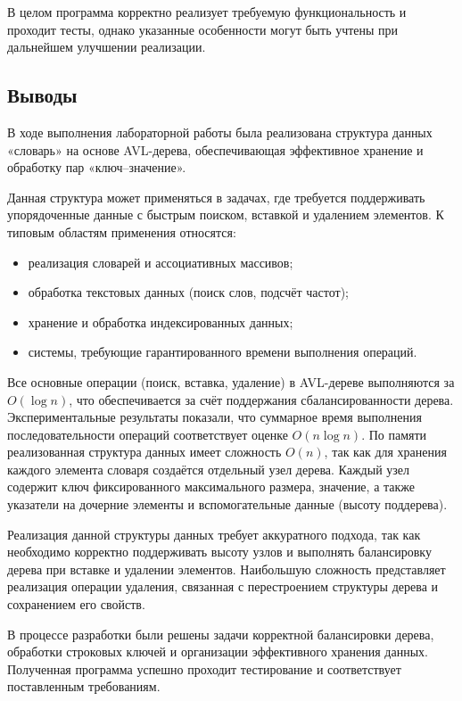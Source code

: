 \documentclass[12pt]{article}
\begin{document}
В целом программа корректно реализует требуемую функциональность и проходит тесты, однако указанные особенности могут быть учтены при дальнейшем улучшении реализации.

\subsection*{Выводы}

В ходе выполнения лабораторной работы была реализована структура данных «словарь» на основе AVL-дерева, обеспечивающая эффективное хранение и обработку пар «ключ–значение».

Данная структура может применяться в задачах, где требуется поддерживать упорядоченные данные с быстрым поиском, вставкой и удалением элементов. К типовым областям применения относятся:
\begin{itemize}
	\item реализация словарей и ассоциативных массивов;
	\item обработка текстовых данных (поиск слов, подсчёт частот);
	\item хранение и обработка индексированных данных;
	\item системы, требующие гарантированного времени выполнения операций.
\end{itemize}

Все основные операции (поиск, вставка, удаление) в AVL-дереве выполняются за $O(\log n)$, что обеспечивается за счёт поддержания сбалансированности дерева. Экспериментальные результаты показали, что суммарное время выполнения последовательности операций соответствует оценке $O(n \log n)$. По памяти реализованная структура данных имеет сложность $O(n)$, так как для хранения каждого элемента словаря создаётся отдельный узел дерева. Каждый узел содержит ключ фиксированного максимального размера, значение, а также указатели на дочерние элементы и вспомогательные данные (высоту поддерева).

Реализация данной структуры данных требует аккуратного подхода, так как необходимо корректно поддерживать высоту узлов и выполнять балансировку дерева при вставке и удалении элементов. Наибольшую сложность представляет реализация операции удаления, связанная с перестроением структуры дерева и сохранением его свойств.

В процессе разработки были решены задачи корректной балансировки дерева, обработки строковых ключей и организации эффективного хранения данных. Полученная программа успешно проходит тестирование и соответствует поставленным требованиям. 
\end{document}

